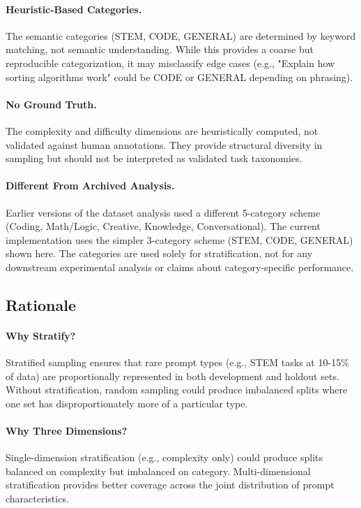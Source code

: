 \paragraph{Heuristic-Based Categories.}
The semantic categories (STEM, CODE, GENERAL) are determined by keyword matching, not semantic understanding. While this provides a coarse but reproducible categorization, it may misclassify edge cases (e.g., "Explain how sorting algorithms work" could be CODE or GENERAL depending on phrasing).

\paragraph{No Ground Truth.}
The complexity and difficulty dimensions are heuristically computed, not validated against human annotations. They provide structural diversity in sampling but should not be interpreted as validated task taxonomies.

\paragraph{Different From Archived Analysis.}
Earlier versions of the dataset analysis used a different 5-category scheme (Coding, Math/Logic, Creative, Knowledge, Conversational). The current implementation uses the simpler 3-category scheme (STEM, CODE, GENERAL) shown here. The categories are used solely for stratification, not for any downstream experimental analysis or claims about category-specific performance.

\subsection{Rationale}

\paragraph{Why Stratify?}
Stratified sampling ensures that rare prompt types (e.g., STEM tasks at 10-15\% of data) are proportionally represented in both development and holdout sets. Without stratification, random sampling could produce imbalanced splits where one set has disproportionately more of a particular type.

\paragraph{Why Three Dimensions?}
Single-dimension stratification (e.g., complexity only) could produce splits balanced on complexity but imbalanced on category. Multi-dimensional stratification provides better coverage across the joint distribution of prompt characteristics.

